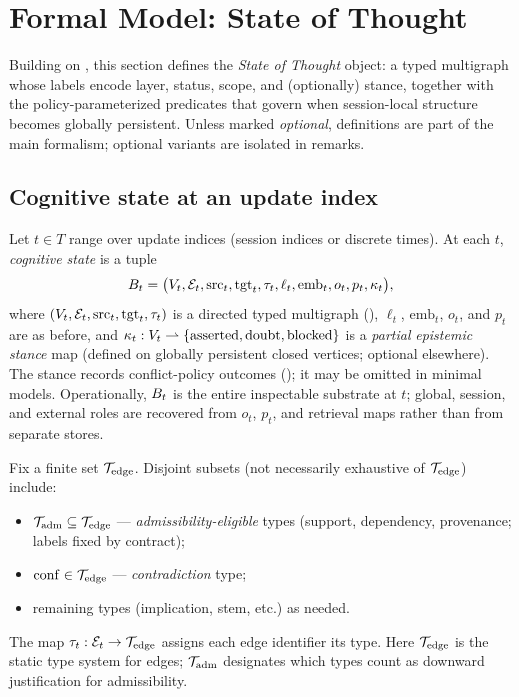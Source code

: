 \section{Formal Model: State of Thought}
\label{sec:formal-model}

Building on , this section defines the \emph{State of Thought} object: a typed multigraph whose labels encode layer, status, scope, and (optionally) stance, together with the policy-parameterized predicates that govern when session-local structure becomes globally persistent.
Unless marked \emph{optional}, definitions are part of the main formalism; optional variants are isolated in remarks.

\subsection{Cognitive state at an update index}
\label{sec:formal-cognitive}

Let $t\in T$ range over update indices (session indices or discrete times).
At each $t$, \emph{cognitive state} is a tuple
\begin{equation}
\label{eq:cognitive-state}
  B_t = \bigl(V_t,\mathcal{E}_t,\mathrm{src}_t,\mathrm{tgt}_t,\tau_t,\ell_t,\mathrm{emb}_t,o_t,p_t,\kappa_t\bigr),
\end{equation}
where $(V_t,\mathcal{E}_t,\mathrm{src}_t,\mathrm{tgt}_t,\tau_t)$ is a directed typed multigraph (),
$\ell_t$, $\mathrm{emb}_t$, $o_t$, and $p_t$ are as before,
and $\kappa_t:V_t\rightharpoonup \{\mathrm{asserted},\mathrm{doubt},\mathrm{blocked}\}$ is a \emph{partial} \emph{epistemic stance} map (defined on globally persistent closed vertices; optional elsewhere).
The stance records conflict-policy outcomes (); it may be omitted in minimal models.
Operationally, $B_t$ is the entire inspectable substrate at $t$; global, session, and external roles are recovered from $o_t$, $p_t$, and retrieval maps rather than from separate stores.

\begin{definition}
\label{def:edge-types}
Fix a finite set $\mathcal{T}_{\mathrm{edge}}$.
Disjoint subsets (not necessarily exhaustive of $\mathcal{T}_{\mathrm{edge}}$) include:
\begin{itemize}[leftmargin=*]
  \item $\mathcal{T}_{\mathrm{adm}}\subseteq \mathcal{T}_{\mathrm{edge}}$ --- \emph{admissibility-eligible} types (support, dependency, provenance; labels fixed by contract);
  \item $\mathrm{conf}\in\mathcal{T}_{\mathrm{edge}}$ --- \emph{contradiction} type;
  \item remaining types (implication, stem, etc.) as needed.
\end{itemize}
The map $\tau_t:\mathcal{E}_t\to\mathcal{T}_{\mathrm{edge}}$ assigns each edge identifier its type.
Here $\mathcal{T}_{\mathrm{edge}}$ is the static type system for edges; $\mathcal{T}_{\mathrm{adm}}$ designates which types count as downward justification for admissibility.
\end{definition}

